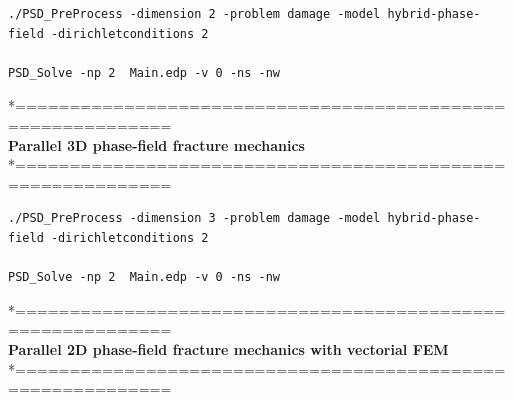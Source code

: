 \begin{lstlisting}[style=Linux]
./PSD_PreProcess -dimension 2 -problem damage -model hybrid-phase-field -dirichletconditions 2   

PSD_Solve -np 2  Main.edp -v 0 -ns -nw   
\end{lstlisting}
*============================================================\\
\textbf{ Parallel 3D phase-field fracture mechanics} \\
*============================================================\\
\begin{lstlisting}[style=Linux]
./PSD_PreProcess -dimension 3 -problem damage -model hybrid-phase-field -dirichletconditions 2   

PSD_Solve -np 2  Main.edp -v 0 -ns -nw   
\end{lstlisting}
*============================================================\\
\textbf{ Parallel 2D phase-field fracture mechanics with vectorial FEM } \\
*============================================================\\

